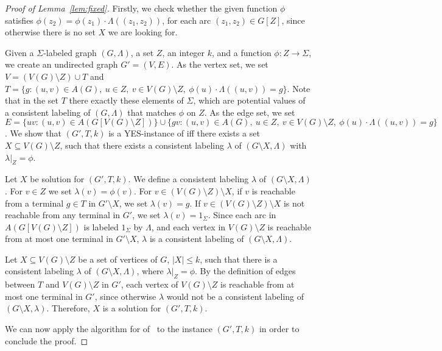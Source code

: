 \documentclass[11pt]{article}
\theoremstyle{definition}
\newcommand{\mwc}{{\sc{Multiway Cut}}\xspace}
\begin{document}
\begin{proof}[Proof of Lemma~\ref{lem:fixed}]
Firstly, we check whether the given function $\phi$ satisfies $\phi(z_2) = \phi(z_1) \cdot \Lambda((z_1,z_2))$,
for each arc $(z_1,z_2) \in G[Z]$, since otherwise there is no set $X$ we are looking for.

Given a $\Sigma$-labeled graph $(G,\Lambda)$,
a set $Z$, an integer $k$, and a function $\phi:Z \rightarrow \Sigma$,
we create an undirected graph $G'=(V,E)$.
As the vertex set, we set $V=(V(G) \setminus Z) \cup T$ and $T=\{g : (u,v) \in A(G),\ u\in Z,\ v \in V(G) \setminus Z,\ \phi(u) \cdot \Lambda((u,v)) = g\}$.
Note that in the set $T$ there exactly these elements of $\Sigma$,
which are potential values of a consistent labeling
of $(G,\Lambda)$ that matches $\phi$ on $Z$.
As the edge set, we set $E=\{uv : (u,v) \in A(G[V(G) \setminus Z])\} \cup \{gv: (u,v) \in A(G),\ u\in Z,\ v\in V(G) \setminus Z,\ \phi(u) \cdot \Lambda((u,v))=g\}$.
We show that $(G',T,k)$ is a YES-instance of \mwc iff 
there exists a set $X\subseteq V(G)\setminus Z$, such that there exists a consistent labeling $\lambda$ of $(G\setminus X, \Lambda)$ with $\lambda|_Z=\phi$.

Let $X$ be solution for $(G',T,k)$. We define a consistent labeling $\lambda$ of $(G\setminus X,\Lambda)$.
For $v \in Z$ we set $\lambda(v) = \phi(v)$. 
For $v \in (V(G) \setminus Z) \setminus X$, if $v$ is reachable from a terminal $g \in T$ in $G'\setminus X$, we set $\lambda(v) = g$.
If $v \in (V(G) \setminus Z) \setminus X$ is not reachable from any terminal in $G'$, we set $\lambda(v) = 1_\Sigma$.
Since each arc in $A(G[V(G) \setminus Z])$ is labeled $1_\Sigma$ by $\Lambda$, 
and each vertex in $V(G) \setminus Z$ is reachable from at most one terminal in $G'\setminus X$,
$\lambda$ is a consistent labeling of $(G\setminus X,\Lambda)$.

Let $X\subseteq V(G)\setminus Z$ be a set of vertices of $G$, $|X| \le k$,
such that there is a consistent labeling $\lambda$ of $(G\setminus X,\Lambda)$,
where $\lambda|_Z=\phi$.
By the definition of edges between $T$ and $V(G) \setminus Z$ in $G'$,
each vertex of $V(G) \setminus Z$ is reachable from at most one terminal in $G'$,
since otherwise $\lambda$ would not be a consistent labeling of $(G\setminus X,\lambda)$.
Therefore, $X$ is a solution for $(G',T,k)$.

We can now apply the algorithm for \mwc of~\cite{nmc:2k} to the instance $(G',T,k)$ in order to conclude the proof.
\end{proof}
\end{document}

